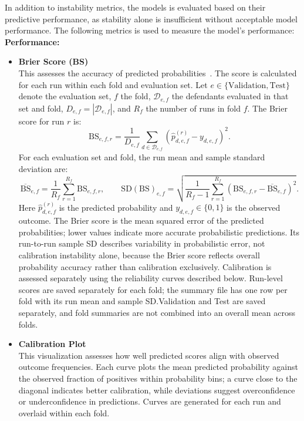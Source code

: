 \documentclass[12pt]{article}
\begin{document}
In addition to instability metrics, the models is evaluated based on their predictive performance, as stability alone is insufficient without acceptable model performance. The following metrics is used to measure the model's performance: \\

\textbf{Performance:} 
\begin{itemize}
  \item \textbf{Brier Score (BS)}\\
    \tabto{2em} This assesses the accuracy of predicted probabilities~\cite{rufibach2010use}. The score is calculated for each run within each fold and evaluation set. Let $e\in\{\mathrm{Validation},\mathrm{Test}\}$ denote the evaluation set, $f$ the fold, $\mathcal{D}_{e,f}$ the defendants evaluated in that set and fold, $D_{e,f}=|\mathcal{D}_{e,f}|$, and $R_f$ the number of runs in fold $f$. The Brier score for run $r$ is:
    \[
    \mathrm{BS}_{e,f,r} = \frac{1}{D_{e,f}}\sum_{d\in\mathcal{D}_{e,f}}
    \left(\hat{p}_{d,e,f}^{(r)}-y_{d,e,f}\right)^2.
    \]
    For each evaluation set and fold, the run mean and sample standard deviation are:
    \[
    \overline{\mathrm{BS}}_{e,f}=\frac{1}{R_f}\sum_{r=1}^{R_f}\mathrm{BS}_{e,f,r},
    \qquad
    \mathrm{SD}(\mathrm{BS})_{e,f}=
    \sqrt{\frac{1}{R_f-1}\sum_{r=1}^{R_f}
    \left(\mathrm{BS}_{e,f,r}-\overline{\mathrm{BS}}_{e,f}\right)^2}.
    \]
    Here $\hat{p}_{d,e,f}^{(r)}$ is the predicted probability and $y_{d,e,f}\in\{0,1\}$ is the observed outcome. The Brier score is the mean squared error of the predicted probabilities; lower values indicate more accurate probabilistic predictions. Its run-to-run sample SD describes variability in probabilistic error, not calibration instability alone, because the Brier score reflects overall probability accuracy rather than calibration exclusively. Calibration is assessed separately using the reliability curves described below. Run-level scores are saved separately for each fold; the summary file has one row per fold with its run mean and sample SD.\@ Validation and Test are saved separately, and fold summaries are not combined into an overall mean across folds.

  \item \textbf{Calibration Plot}\\
  \tabto{2em} This visualization assesses how well predicted scores align with observed outcome frequencies. Each curve plots the mean predicted probability against the observed fraction of positives within probability bins; a curve close to the diagonal indicates better calibration, while deviations suggest overconfidence or underconfidence in predictions. Curves are generated for each run and overlaid within each fold.


\end{itemize}
\end{document}
